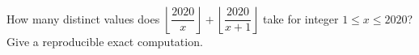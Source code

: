 How many distinct values does $\left\lfloor\dfrac{2020}{x}\right\rfloor+\left\lfloor\dfrac{2020}{x+1}\right\rfloor$ take for integer $1\le x\le2020$? Give a reproducible exact computation.
